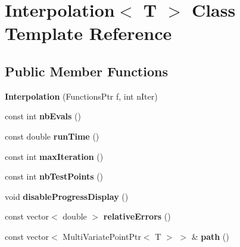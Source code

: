 \hypertarget{class_interpolation}{}\section{Interpolation$<$ T $>$ Class Template Reference}
\label{class_interpolation}
\subsection*{Public Member Functions}
\begin{DoxyCompactItemize}
\item 
{\bfseries Interpolation} (Functions\+Ptr f, int n\+Iter)\hypertarget{class_interpolation_a486945890aff3b8b7a0e77395e7701de}{}\label{class_interpolation_a486945890aff3b8b7a0e77395e7701de}

\item 
const int {\bfseries nb\+Evals} ()\hypertarget{class_interpolation_af62064f49d50af2e7eb2e5d6fca3ef0b}{}\label{class_interpolation_af62064f49d50af2e7eb2e5d6fca3ef0b}

\item 
const double {\bfseries run\+Time} ()\hypertarget{class_interpolation_a6217fd13a4a5689bd5b264593a444d89}{}\label{class_interpolation_a6217fd13a4a5689bd5b264593a444d89}

\item 
const int {\bfseries max\+Iteration} ()\hypertarget{class_interpolation_a2f8ae16c6e463b6275c6897cb23c8cfb}{}\label{class_interpolation_a2f8ae16c6e463b6275c6897cb23c8cfb}

\item 
const int {\bfseries nb\+Test\+Points} ()\hypertarget{class_interpolation_a463273f663959f84cb189ec6c9b8805b}{}\label{class_interpolation_a463273f663959f84cb189ec6c9b8805b}

\item 
void {\bfseries disable\+Progress\+Display} ()\hypertarget{class_interpolation_a6227a56bfa2c825a700e5e3cffabe440}{}\label{class_interpolation_a6227a56bfa2c825a700e5e3cffabe440}

\item 
const vector$<$ double $>$ {\bfseries relative\+Errors} ()\hypertarget{class_interpolation_a7601bc7349ed82e28c7e7e3f9d925d18}{}\label{class_interpolation_a7601bc7349ed82e28c7e7e3f9d925d18}

\item 
const vector$<$ Multi\+Variate\+Point\+Ptr$<$ T $>$ $>$ \& {\bfseries path} ()\hypertarget{class_interpolation_a6820ea94303e15adad2c1608a94aea96}{}\label{class_interpolation_a6820ea94303e15adad2c1608a94aea96}


\end{DoxyCompactItemize}
